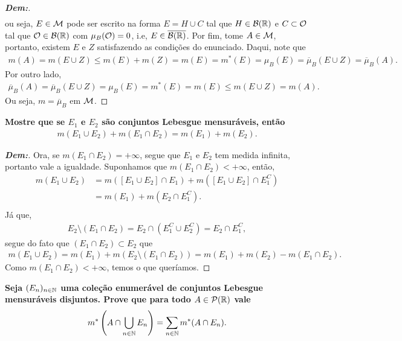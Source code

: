 {\begin{enumerate}[label=(\alph*), wide, labelindent=0pt]
\begin{proof}[\textbf{Dem:}]
\begin{align*}
      \end{align*}
      ou seja, $E\in \mathcal M$ pode ser escrito na forma $E = H \cup C$ tal que $H \in \mathcal B(\mathbb R)$
      e $C\subset \mathcal O$ tal que $\mathcal O \in \mathcal B(\mathbb R)$ com $\mu_B(\mathcal O) = 0$, i.e, 
      $E \in \overline{\mathcal B(\mathbb R)}$. Por fim, tome $A \in \mathcal M$, portanto, existem 
      $E$ e $Z$ satisfazendo as condições do enunciado. Daqui, note que
      \begin{align*}
        m(A) = m(E\cup Z) \le m(E) + m(Z) = m(E) = m^*(E) = \mu_B(E) = \overline\mu_B(E\cup Z) = \overline\mu_B(A).
      \end{align*}
      Por outro lado, 
      \begin{align*}
        \overline\mu_B(A) = \overline\mu_B(E\cup Z) = \mu_B(E) = m^*(E) = m(E) \le m(E\cup Z) = m(A).
      \end{align*} 
      Ou seja, $m = \overline \mu_B$ em $\mathcal M$.
    \end{proof}
\end{enumerate}}
\biglinend
\newpage
{}
\myexe{\thedois}
\bigline 
\textbf{Mostre que se $E_1$ e $E_2$ são conjuntos Lebesgue mensuráveis, então 
\begin{align*}
  m(E_1 \cup E_2) + m(E_1 \cap E_2) = m(E_1) + m(E_2).
\end{align*}}
\begin{proof}[\textbf{Dem:}] Ora, se $m(E_1 \cap E_2) = +\infty$, segue que $E_1$ 
  e $E_2$ tem medida infinita, portanto vale a igualdade. Suponhamos que $m(E_1 \cap E_2)<+\infty$,
  então, 
  \begin{align*}
    m(E_1\cup E_2) &= m([E_1 \cup E_2]\cap E_1) + m([E_1 \cup E_2]\cap E_1^C)\\
    &= m(E_1) + m(E_2 \cap E_1^C).\\
  \end{align*}
  Já que, 
  \begin{align*}
    E_2 \setminus (E_1 \cap E_2) = E_2 \cap (E_1^C \cup E_2^C) = E_2\cap E_1^C,
  \end{align*}
  segue do fato que $(E_1 \cap E_2) \subset E_2$ que
  \begin{align*}
    m(E_1 \cup E_2) = m(E_1) + m(E_2 \setminus(E_1 \cap E_2)) = m(E_1) + m(E_2) - m(E_1 \cap E_2).
  \end{align*}
  Como $m(E_1 \cap E_2)<+\infty$, temos o que queríamos.
\end{proof}
\biglinend
\newpage
{}
\myexe{\thedois}
\bigline 
\textbf{Seja $(E_n)_{n \in \mathbb N}$ uma coleção enumerável de conjuntos Lebesgue mensuráveis disjuntos. Prove 
que para todo $A \in \mathcal P(\mathbb R)$ vale
\begin{align*}
  m^*\left(A \cap \bigcup\limits_{n \in \mathbb N} E_n\right) = \sum_{n \in \mathbb N}m^*(A\cap E_n).
\end{align*}}
